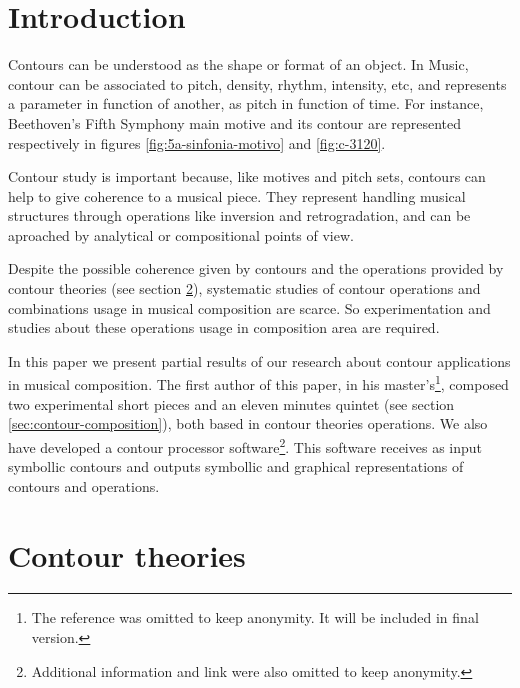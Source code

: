 

\section{Introduction}
\label{sec:introduction}

Contours can be understood as the shape or format of an object. In
Music, contour can be associated to pitch, density, rhythm, intensity,
etc, and represents a parameter in function of another, as pitch in
function of time. For instance, Beethoven's Fifth Symphony main motive
and its contour are represented respectively in figures
\ref{fig:5a-sinfonia-motivo} and \ref{fig:c-3120}.

Contour study is important because, like motives and pitch sets,
contours can help to give coherence to a musical piece. They represent
handling musical structures through operations like inversion and
retrogradation, and can be aproached by analytical or compositional
points of view.

Despite the possible coherence given by contours and the operations
provided by contour theories (see section \ref{sec:contour-theories}),
systematic studies of contour operations and combinations usage in
musical composition are scarce. So experimentation and studies about
these operations usage in composition area are required.

In this paper we present partial results of our research about contour
applications in musical composition. The first author of this paper,
in his master's\footnote{The reference was omitted to keep
  anonymity. It will be included in final version.}, composed two
experimental short pieces and an eleven minutes quintet (see section
\ref{sec:contour-composition}), both based in contour theories
operations. We also have developed a contour processor
software\footnote{Additional information and link were also omitted to
  keep anonymity.}. This software receives as input symbollic contours
and outputs symbollic and graphical representations of contours and
operations.

\section{Contour theories}
\label{sec:contour-theories}


